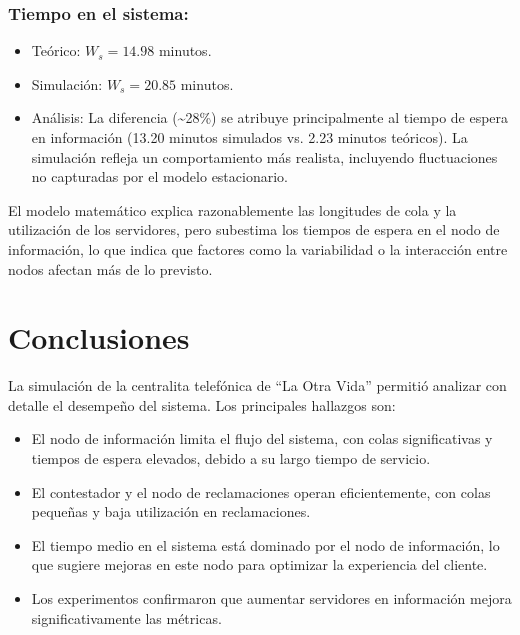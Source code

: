 \documentclass[12pt]{article}
\begin{document}
\subsubsection{Tiempo en el sistema:}
\begin{itemize}
    \item Teórico: $W_s = 14.98$ minutos.
    \item Simulación: $W_s = 20.85$ minutos.
    \item Análisis: La diferencia (\textasciitilde 28\%) se atribuye principalmente al tiempo de espera en información (13.20 minutos simulados vs. 2.23 minutos teóricos). La simulación refleja un comportamiento más realista, incluyendo fluctuaciones no capturadas por el modelo estacionario.
\end{itemize}

El modelo matemático explica razonablemente las longitudes de cola y la utilización de los servidores, pero subestima los tiempos de espera en el nodo de información, lo que indica que factores como la variabilidad o la interacción entre nodos afectan más de lo previsto.

\section{Conclusiones}
La simulación de la centralita telefónica de “La Otra Vida” permitió analizar con detalle el desempeño del sistema. Los principales hallazgos son:
\begin{itemize}
    \item El nodo de información limita el flujo del sistema, con colas significativas y tiempos de espera elevados, debido a su largo tiempo de servicio.
    \item El contestador y el nodo de reclamaciones operan eficientemente, con colas pequeñas y baja utilización en reclamaciones.
    \item El tiempo medio en el sistema está dominado por el nodo de información, lo que sugiere mejoras en este nodo para optimizar la experiencia del cliente.
    \item Los experimentos confirmaron que aumentar servidores en información mejora significativamente las métricas.
\end{itemize}
\end{document}
